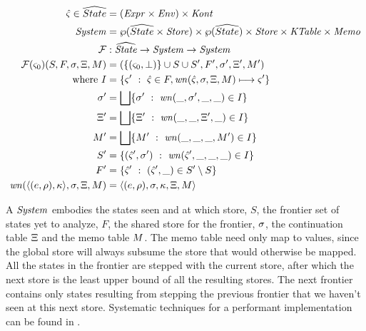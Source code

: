 \begin{align*}
  \hat\varsigma \in \widehat{State} &= (\mathit{Expr} \times \mathit{Env}) \times \mathit{Kont} \\
  \mathit{System} &= \wp(\widehat{State} \times \mathit{Store}) \times \wp(\widehat{State}) \times \mathit{Store} \times \mathit{KTable} \times \mathit{Memo} \\
  {\mathcal F} &: \widehat{\mathit{State}} \to \mathit{System} \to \mathit{System} \\
  {\mathcal F}(\varsigma_0)(S, F, \sigma, \Xi, M) &= (\{ (\varsigma_0,\bot) \} \cup S \cup S', F', \sigma', \Xi', M') \\
  \text{where } I &= \{ \varsigma'\ :\ \hat\varsigma \in F, \mathit{wn}(\hat\varsigma,\sigma,\Xi,M) \longmapsto \varsigma'\} \\
                \sigma' &= \bigsqcup\{ \sigma'\ :\ \mathit{wn}(\_, \sigma',\_,\_) \in I\} \\
                \Xi' &=  \bigsqcup\{ \Xi'\ :\ \mathit{wn}(\_, \_, \Xi', \_) \in I\} \\
                M' &=  \bigsqcup\{ M'\ :\ \mathit{wn}(\_, \_, \_, M') \in I\} \\
                S' &= \{ (\hat\varsigma',\sigma')\ :\ \mathit{wn}(\hat\varsigma', \_, \_, \_) \in I\} \\
                F' &= \{ \hat\varsigma'\ :\ (\hat\varsigma',\_) \in S' \setminus S\} \\
                \mathit{wn}(\langle (e,\rho),\kappa \rangle,\sigma,\Xi,M)
                   &= \langle (e,\rho),\sigma,\kappa,\Xi,M \rangle
\end{align*}

A $\mathit{System}$ embodies the states seen and at which store, $S$, the frontier set of states yet to analyze, $F$, the shared store for the frontier, $\sigma$, the continuation table $\Xi$ and the memo table $M$.
%
The memo table need only map to values, since the global store will always subsume the store that would otherwise be mapped.
%
All the states in the frontier are stepped with the current store, after which the next store is the least upper bound of all the resulting stores.
%
The next frontier contains only states resulting from stepping the previous frontier that we haven't seen at this next store.
%
Systematic techniques for a performant implementation can be found in \citet{ianjohnson:oaam:icfp2013}.

